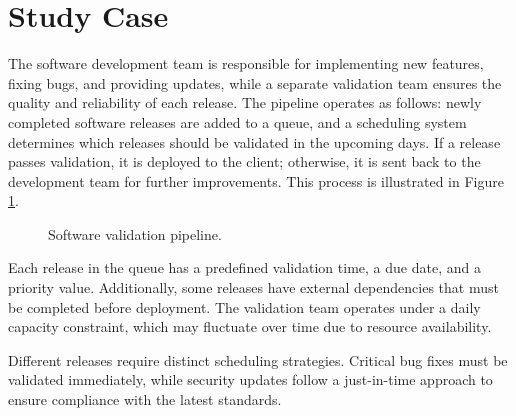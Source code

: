 \documentclass[12pt]{article}
\begin{document}



\section*{Study Case}

The software development team is responsible for implementing new features, fixing bugs, and providing updates, while a separate validation team ensures the quality and reliability of each release. The pipeline operates as follows: newly completed software releases are added to a queue, and a scheduling system determines which releases should be validated in the upcoming days. If a release passes validation, it is deployed to the client; otherwise, it is sent back to the development team for further improvements. This process is illustrated in Figure \ref{fig:pipeline}.

\begin{figure}[h]
    \centering
    \caption{Software validation pipeline.}
    \label{fig:pipeline}
\end{figure}

Each release in the queue has a predefined validation time, a due date, and a priority value. Additionally, some releases have external dependencies that must be completed before deployment. The validation team operates under a daily capacity constraint, which may fluctuate over time due to resource availability.

Different releases require distinct scheduling strategies. Critical bug fixes must be validated immediately, while security updates follow a just-in-time approach to ensure compliance with the latest standards.
\end{document}
